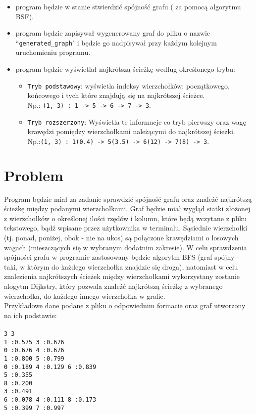 \documentclass[12pt, a4paper]{article}
\begin{document}
\begin{itemize}
\item program będzie w stanie stwierdzić spójność grafu ( za pomocą algorytmu BSF).

\item program będzie zapisywał wygenerowany graf do pliku o nazwie\\``\texttt{generated\_graph}" i będzie go nadpisywał przy każdym kolejnym uruchomieniu programu.

\newpage
\item program będzie wyświetlał najkrótszą ścieżkę według określonego trybu:
\begin{itemize}
    \item \texttt{Tryb podstawowy}: wyświetla indeksy wierzchołków: początkowego, końcowego i tych które znajdują się na najkrótszej ścieżce.\\ Np.: \texttt{(1, 3) : 1 -> 5 -> 6 -> 7 -> 3}.
    \item \texttt{Tryb rozszerzony}: Wyświetla te informacje co tryb pierwszy oraz wagę krawędzi pomiędzy wierzchołkami należącymi do najkrótszej ścieżki. \\Np.:\texttt{(1, 3) : 1(0.4) -> 5(3.5) -> 6(12) -> 7(8) -> 3}.
\end{itemize}

\end{itemize}


\section{Problem}
Program będzie miał za zadanie sprawdzić spójność grafu oraz znaleźć najkrótszą ścieżkę między podanymi wierzchołkami. Graf będzie miał wygląd siatki złożonej z wierzchołków o określonej ilości rzędów i kolumn, które będą wczytane z pliku tekstowego, bądź wpisane przez użytkownika w terminalu. Sąsiednie wierzchołki (tj. ponad, poniżej, obok - nie na ukos) są połączone krawędziami o losowych wagach (mieszczących się w wybranym dodatnim zakresie). W celu sprawdzenia spójności grafu w programie zastosowany będzie algorytm BFS (graf spójny - taki, w którym do każdego wierzchołka znajdzie się droga), natomiast w celu znalezienia najkrótszych ścieżek między wierzchołkami wykorzystany zostanie alogytm Dijkstry, który pozwala znaleźć najkrótszą ścieżkę z wybranego wierzchołka, do każdego innego wierzchołka w grafie.\\
\newpage
Przykładowe dane podane z pliku o odpowiednim formacie oraz graf utworzony na ich podstawie:\\\\
\texttt{3 3}\\
\texttt{1 :0.575  3 :0.676}\\
\texttt{0 :0.676  4 :0.676}\\
\texttt{1 :0.800  5 :0.799}\\
\texttt{0 :0.189  4 :0.129  6 :0.839}\\
\texttt{5 :0.355}\\
\texttt{8 :0.200}\\
\texttt{3 :0.491}\\
\texttt{6 :0.078  4 :0.111 8 :0.173}\\
\texttt{5 :0.399  7 :0.997}\\
\end{document}
